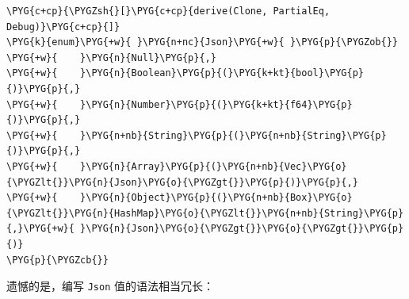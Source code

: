 \begin{Verbatim}[commandchars=\\\{\},breaklines=true,breakanywhere=true,fontsize=\codefont,xleftmargin=17bp]
\PYG{c+cp}{\PYGZsh{}[}\PYG{c+cp}{derive(Clone, PartialEq, Debug)}\PYG{c+cp}{]}
\PYG{k}{enum}\PYG{+w}{ }\PYG{n+nc}{Json}\PYG{+w}{ }\PYG{p}{\PYGZob{}}
\PYG{+w}{    }\PYG{n}{Null}\PYG{p}{,}
\PYG{+w}{    }\PYG{n}{Boolean}\PYG{p}{(}\PYG{k+kt}{bool}\PYG{p}{)}\PYG{p}{,}
\PYG{+w}{    }\PYG{n}{Number}\PYG{p}{(}\PYG{k+kt}{f64}\PYG{p}{)}\PYG{p}{,}
\PYG{+w}{    }\PYG{n+nb}{String}\PYG{p}{(}\PYG{n+nb}{String}\PYG{p}{)}\PYG{p}{,}
\PYG{+w}{    }\PYG{n}{Array}\PYG{p}{(}\PYG{n+nb}{Vec}\PYG{o}{\PYGZlt{}}\PYG{n}{Json}\PYG{o}{\PYGZgt{}}\PYG{p}{)}\PYG{p}{,}
\PYG{+w}{    }\PYG{n}{Object}\PYG{p}{(}\PYG{n+nb}{Box}\PYG{o}{\PYGZlt{}}\PYG{n}{HashMap}\PYG{o}{\PYGZlt{}}\PYG{n+nb}{String}\PYG{p}{,}\PYG{+w}{ }\PYG{n}{Json}\PYG{o}{\PYGZgt{}}\PYG{o}{\PYGZgt{}}\PYG{p}{)}
\PYG{p}{\PYGZcb{}}
\end{Verbatim}

遗憾的是，编写 \texttt{Json} 值的语法相当冗长：

